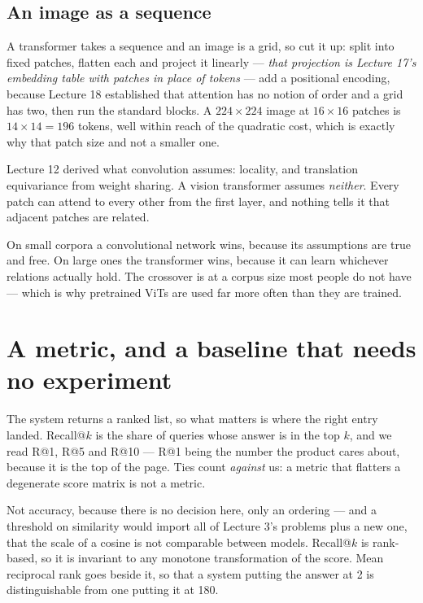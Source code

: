 \documentclass[11pt,a4paper]{article}
\begin{document}
\subsection{An image as a sequence}

A transformer takes a sequence and an image is a grid, so cut it up: split into
fixed patches, flatten each and project it linearly --- \emph{that projection
is Lecture 17's embedding table with patches in place of tokens} --- add a
positional encoding, because Lecture 18 established that attention has no
notion of order and a grid has two, then run the standard blocks. A
$224\times224$ image at $16\times16$ patches is $14\times14 = 196$ tokens, well
within reach of the quadratic cost, which is exactly why that patch size and
not a smaller one.

\begin{keybox}[title={What a ViT gives up}]
Lecture 12 derived what convolution assumes: locality, and translation
equivariance from weight sharing. A vision transformer assumes \emph{neither}.
Every patch can attend to every other from the first layer, and nothing tells
it that adjacent patches are related.

On small corpora a convolutional network wins, because its assumptions are true
and free. On large ones the transformer wins, because it can learn whichever
relations actually hold. The crossover is at a corpus size most people do not
have --- which is why pretrained ViTs are used far more often than they are
trained.
\end{keybox}

\section{A metric, and a baseline that needs no experiment}

The system returns a ranked list, so what matters is where the right entry
landed. Recall@$k$ is the share of queries whose answer is in the top $k$, and
we read R@1, R@5 and R@10 --- R@1 being the number the product cares about,
because it is the top of the page. Ties count \emph{against} us: a metric that
flatters a degenerate score matrix is not a metric.

Not accuracy, because there is no decision here, only an ordering --- and a
threshold on similarity would import all of Lecture 3's problems plus a new
one, that the scale of a cosine is not comparable between models. Recall@$k$ is
rank-based, so it is invariant to any monotone transformation of the score.
Mean reciprocal rank goes beside it, so that a system putting the answer at 2
is distinguishable from one putting it at 180.
\end{document}
